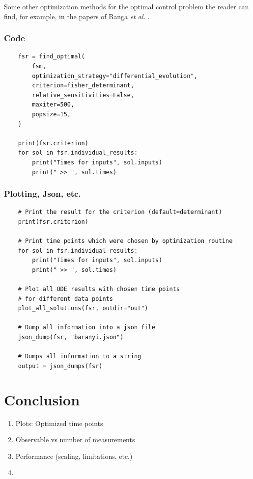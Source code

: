 \documentclass[10pt,A4paper]{article}
\newcommand{\etal}{{\textit{et al. }}}
\begin{document}
Some other optimization methods for the optimal control problem the reader can find, for example, in the papers of Banga \etal \cite{BANGA2005407, BANGA2003131}.
%
\subsubsection*{Code}

\begin{verbatim}
    fsr = find_optimal(
        fsm,
        optimization_strategy="differential_evolution",
        criterion=fisher_determinant,
        relative_sensitivities=False,
        maxiter=500,
        popsize=15,
    )

    print(fsr.criterion)
    for sol in fsr.individual_results:
        print("Times for inputs", sol.inputs)
        print(" >> ", sol.times)
\end{verbatim}
%
\subsubsection*{Plotting, Json, etc.}
\begin{verbatim}
    # Print the result for the criterion (default=determinant)
    print(fsr.criterion)
    
    # Print time points which were chosen by optimization routine
    for sol in fsr.individual_results:
        print("Times for inputs", sol.inputs)
        print(" >> ", sol.times)

    # Plot all ODE results with chosen time points
    # for different data points
    plot_all_solutions(fsr, outdir="out")

    # Dump all information into a json file
    json_dump(fsr, "baranyi.json")

    # Dumps all information to a string
    output = json_dumps(fsr)
\end{verbatim}
%
%
%
\section*{Conclusion}
\begin{enumerate}
    \item Plots: Optimized time points
    \item Observable vs number of measurements
    \item Performance (scaling, limitations, etc.)
    \item 
\end{enumerate}
\end{document}
